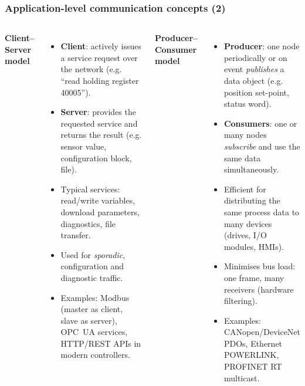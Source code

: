 \begin{frame}
	\frametitle{Application-level communication concepts (2)}
	\small
	\begin{columns}[T,totalwidth=\textwidth]
			\textbf{Client–Server model}
			\begin{itemize}
				\item \textbf{Client}: actively issues a service request over the network
					(e.g. ``read holding register 40005'').
				\item \textbf{Server}: provides the requested service and returns the result
					(e.g. sensor value, configuration block, file).
				\item Typical services: read/write variables, download parameters,
					diagnostics, file transfer.
				\item Used for \emph{sporadic}, configuration and diagnostic traffic.
				\item Examples: Modbus (master as client, slave as server), OPC~UA services,
					HTTP/REST APIs in modern controllers.
			\end{itemize}
			\textbf{Producer–Consumer model}
			\begin{itemize}
				\item \textbf{Producer}: one node periodically or on event \emph{publishes}
					a data object (e.g. position set-point, status word).
				\item \textbf{Consumers}: one or many nodes \emph{subscribe} and use the
					same data simultaneously.
				\item Efficient for distributing the same process data to many devices
					(drives, I/O modules, HMIs).
				\item Minimises bus load: one frame, many receivers (hardware filtering).
				\item Examples: CANopen/DeviceNet PDOs, Ethernet POWERLINK,
					PROFINET RT multicast.
			\end{itemize}
	\end{columns}
\end{frame}

